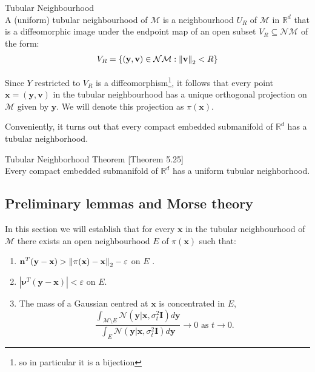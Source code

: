 \begin{definition}
Tubular Neighbourhood\\
A (uniform) tubular neighbourhood of $\mathcal{M}$ is a neighbourhood $U_R$ of $\mathcal{M}$ in $\mathbb{R}^d$ that is a diffeomorphic image under the endpoint map of an open subset $V_R \subseteq \mathcal{NM}$ of the form:
\begin{gather*}
    V_R = \{ (\textbf{y},\textbf{v}) \in \mathcal{NM}: \left\lVert \textbf{v} \right\rVert_2 < R \} 
\end{gather*}
\end{definition}
Since $Y$ restricted to $V_R$ is a diffeomorphism\footnote{so in particular it is a bijection}, it follows  that every point $\textbf{x} = (\textbf{y},\textbf{v})$ in the tubular neighbourhood has a unique orthogonal projection on $\mathcal{M}$ given by $\textbf{y}$. We will denote this projection as $\pi(\textbf{x})$.

Conveniently, it turns out that every  compact embedded submanifold of $\mathbb{R}^d$ has a tubular neighborhood.

\begin{theorem}
Tubular Neighborhood Theorem [Theorem 5.25]\cite{lee2019_riemman} \\  
Every  compact  embedded submanifold of $\mathbb{R}^d$ has a uniform tubular neighborhood.
\end{theorem}

\subsection*{Preliminary lemmas and  Morse theory}
In this section we will establish that for every $\textbf{x}$ in the tubular neighbourhood of $\mathcal{M}$ there exists an open neighbourhood $E$ of $\pi(\textbf{x})$ such that:
\begin{enumerate}
    \item $\textbf{n}^T(\textbf{y}-\textbf{x}) > \left\lVert \pi(\textbf{x}) - \textbf{x} \right\rVert_2 - \varepsilon $ on $E$ .
    \item $|\boldsymbol{\nu}^T(\textbf{y}-\textbf{x})| < \varepsilon$ on $E$.
    \item %
    The mass of a Gaussian centred at $\textbf{x}$ is concentrated in $E$,
    $$ \frac{\int_{\mathcal{M} \setminus E}\mathcal{N}(\textbf{y} | \textbf{x}, \sigma^2_t\textbf{I}) d\textbf{y}}{ \int_E \mathcal{N}(\textbf{y} | \textbf{x}, \sigma^2_t\textbf{I}) d\textbf{y}} \to 0 \text{ as } t \to 0. $$
\end{enumerate}

